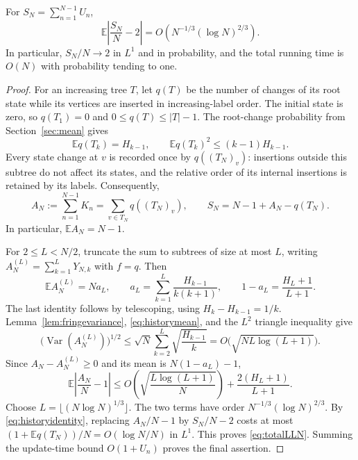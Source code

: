 \documentclass[runningheads,envcountsame,orivec]{llncs}
\newcommand{\E}{\mathbb E}
\begin{document}
\begin{theorem}\label{thm:total}
For $S_N=\sum_{n=1}^{N-1}U_n$,
\begin{equation}\label{eq:totalLLN}
 \E\left|\frac{S_N}{N}-2\right|
 =O\left(N^{-1/3}(\log N)^{2/3}\right).
\end{equation}
In particular, $S_N/N\to2$ in $L^1$ and in probability, and the total
running time is $O(N)$ with probability tending to one.
\end{theorem}
\begin{proof}
For an increasing tree $T$, let $q(T)$ be the number of changes of its
root state while its vertices are inserted in increasing-label order.
The initial state is zero, so $q(T_1)=0$ and $0\le q(T)\le |T|-1$.
The root-change probability from Section~\ref{sec:mean} gives
\begin{equation}\label{eq:historymean}
 \E q(T_k)=H_{k-1},\qquad
 \E q(T_k)^2\le(k-1)H_{k-1}.
\end{equation}
Every state change at $v$ is recorded once by $q((T_N)_v)$: insertions
outside this subtree do not affect its states, and the relative order
of its internal insertions is retained by its labels. Consequently,
\begin{equation}\label{eq:historyidentity}
 A_N:=\sum_{n=1}^{N-1}K_n=\sum_{v\in T_N}q((T_N)_v),\qquad
 S_N=N-1+A_N-q(T_N).
\end{equation}
In particular, $\E A_N=N-1$.

For $2\le L<N/2$, truncate the sum to subtrees of size at most $L$,
writing $A_N^{(L)}=\sum_{k=1}^L Y_{N,k}$ with $f=q$. Then
\[
 \E A_N^{(L)}=Na_L,\qquad
 a_L=\sum_{k=1}^L\frac{H_{k-1}}{k(k+1)},\qquad
 1-a_L=\frac{H_L+1}{L+1}.
\]
The last identity follows by telescoping, using
$H_k-H_{k-1}=1/k$. Lemma~\ref{lem:fringevariance},
\eqref{eq:historymean}, and the $L^2$ triangle inequality give
\[
 \bigl(\operatorname{Var}(A_N^{(L)})\bigr)^{1/2}
 \le\sqrt N\sum_{k=2}^L\sqrt{\frac{H_{k-1}}k}
 =O\bigl(\sqrt{NL\log(L+1)}\bigr).
\]
Since $A_N-A_N^{(L)}\ge0$ and its mean is $N(1-a_L)-1$,
\[
 \E\left|\frac{A_N}{N}-1\right|
 \le O\left(\sqrt{\frac{L\log(L+1)}N}\right)
       +\frac{2(H_L+1)}{L+1}.
\]
Choose $L=\lfloor(N\log N)^{1/3}\rfloor$. The two terms have order
$N^{-1/3}(\log N)^{2/3}$. By \eqref{eq:historyidentity}, replacing
$A_N/N-1$ by $S_N/N-2$ costs at most
$(1+\E q(T_N))/N=O(\log N/N)$ in $L^1$. This proves
\eqref{eq:totalLLN}. Summing the update-time bound
$O(1+U_n)$ proves the final assertion.
\end{proof}
\end{document}
